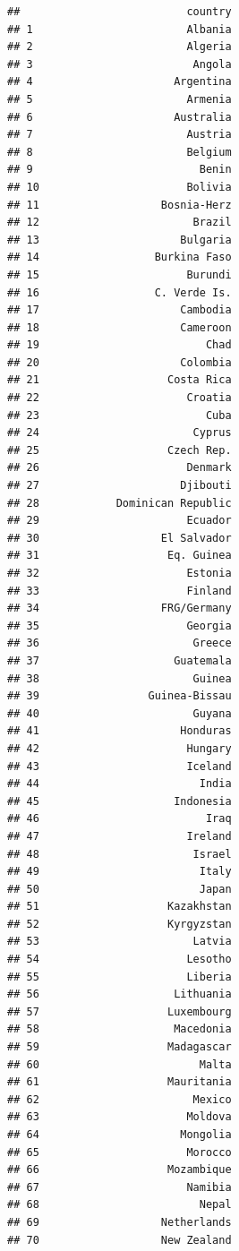 \documentclass[
]{article}
\begin{document}
\begin{verbatim}
##                          country
## 1                        Albania
## 2                        Algeria
## 3                         Angola
## 4                      Argentina
## 5                        Armenia
## 6                      Australia
## 7                        Austria
## 8                        Belgium
## 9                          Benin
## 10                       Bolivia
## 11                   Bosnia-Herz
## 12                        Brazil
## 13                      Bulgaria
## 14                  Burkina Faso
## 15                       Burundi
## 16                  C. Verde Is.
## 17                      Cambodia
## 18                      Cameroon
## 19                          Chad
## 20                      Colombia
## 21                    Costa Rica
## 22                       Croatia
## 23                          Cuba
## 24                        Cyprus
## 25                    Czech Rep.
## 26                       Denmark
## 27                      Djibouti
## 28            Dominican Republic
## 29                       Ecuador
## 30                   El Salvador
## 31                    Eq. Guinea
## 32                       Estonia
## 33                       Finland
## 34                   FRG/Germany
## 35                       Georgia
## 36                        Greece
## 37                     Guatemala
## 38                        Guinea
## 39                 Guinea-Bissau
## 40                        Guyana
## 41                      Honduras
## 42                       Hungary
## 43                       Iceland
## 44                         India
## 45                     Indonesia
## 46                          Iraq
## 47                       Ireland
## 48                        Israel
## 49                         Italy
## 50                         Japan
## 51                    Kazakhstan
## 52                    Kyrgyzstan
## 53                        Latvia
## 54                       Lesotho
## 55                       Liberia
## 56                     Lithuania
## 57                    Luxembourg
## 58                     Macedonia
## 59                    Madagascar
## 60                         Malta
## 61                    Mauritania
## 62                        Mexico
## 63                       Moldova
## 64                      Mongolia
## 65                       Morocco
## 66                    Mozambique
## 67                       Namibia
## 68                         Nepal
## 69                   Netherlands
## 70                   New Zealand

\end{verbatim}
\end{document}

